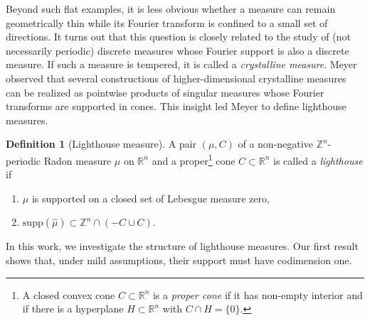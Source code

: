 \documentclass[11pt,letterpaper]{amsart}
\theoremstyle{definition}
\newtheorem{Def}{Definition}[section]
\theoremstyle{plain}
\newcommand{\R}{{\mathbb R}}
\newcommand{\Z}{{\mathbb Z}}
\begin{document}
Beyond such flat examples, it is less obvious whether a measure can remain geometrically thin while its Fourier transform is confined to a small set of directions. 
It turns out that this question is closely related to the study of (not necessarily periodic) discrete measures whose Fourier support is also a discrete measure. 
If such a measure is tempered, it is called a \emph{crystalline measure}. Meyer \cite{Meyer2023} observed that several constructions of higher-dimensional
crystalline measures can be realized as pointwise products of singular measures whose
Fourier transforms are supported in cones. This insight led Meyer to define
lighthouse measures.

\begin{Def}[Lighthouse measure]
A pair $(\mu,C)$ of a non-negative $\Z^n$-periodic Radon measure $\mu$
on $\R^n$ and a proper\footnote{A closed convex cone $C\subset\R^n$ is a \emph{proper cone} if it has non-empty interior and if there is a hyperplane $H\subset\R^n$ with $C\cap H=\{0\}$.} cone $C\subset\R^n$ is called a \emph{lighthouse} if
\begin{enumerate}
    \item $\mu$ is supported on a closed set of Lebesgue measure zero,
    \item $\mathrm{supp}(\widehat{\mu})\subset \Z^n\cap(-C\cup C)$.
\end{enumerate}
\end{Def}

In this work, we investigate the structure of lighthouse measures.
Our first result shows that, under mild assumptions, their support must
have codimension one.
\end{document}
